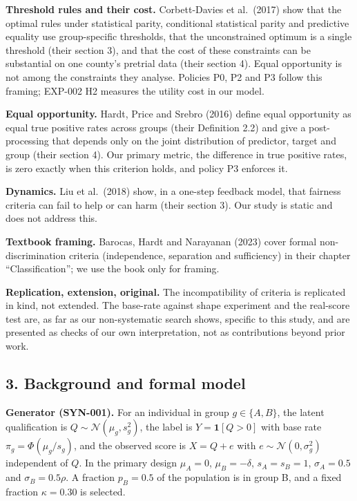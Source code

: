 \documentclass[
]{article}
\begin{document}
\textbf{Threshold rules and their cost.} Corbett-Davies et al.~(2017)
show that the optimal rules under statistical parity, conditional
statistical parity and predictive equality use group-specific
thresholds, that the unconstrained optimum is a single threshold (their
section 3), and that the cost of these constraints can be substantial on
one county's pretrial data (their section 4). Equal opportunity is not
among the constraints they analyse. Policies P0, P2 and P3 follow this
framing; EXP-002 H2 measures the utility cost in our model.

\textbf{Equal opportunity.} Hardt, Price and Srebro (2016) define equal
opportunity as equal true positive rates across groups (their Definition
2.2) and give a post-processing that depends only on the joint
distribution of predictor, target and group (their section 4). Our
primary metric, the difference in true positive rates, is zero exactly
when this criterion holds, and policy P3 enforces it.

\textbf{Dynamics.} Liu et al.~(2018) show, in a one-step feedback model,
that fairness criteria can fail to help or can harm (their section 3).
Our study is static and does not address this.

\textbf{Textbook framing.} Barocas, Hardt and Narayanan (2023) cover
formal non-discrimination criteria (independence, separation and
sufficiency) in their chapter ``Classification''; we use the book only
for framing.

\textbf{Replication, extension, original.} The incompatibility of
criteria is replicated in kind, not extended. The base-rate against
shape experiment and the real-score test are, as far as our
non-systematic search shows, specific to this study, and are presented
as checks of our own interpretation, not as contributions beyond prior
work.

\subsection{3. Background and formal
model}\label{background-and-formal-model}

\textbf{Generator (SYN-001).} For an individual in group
\(g \in \{A, B\}\), the latent qualification is
\(Q \sim \mathcal{N}(\mu_g, s_g^2)\), the label is
\(Y = \mathbf{1}[Q > 0]\) with base rate \(\pi_g = \Phi(\mu_g / s_g)\),
and the observed score is \(X = Q + e\) with
\(e \sim \mathcal{N}(0, \sigma_g^2)\) independent of \(Q\). In the
primary design \(\mu_A = 0\), \(\mu_B = -\delta\), \(s_A = s_B = 1\),
\(\sigma_A = 0.5\) and \(\sigma_B = 0.5\rho\). A fraction \(p_B = 0.5\)
of the population is in group B, and a fixed fraction \(\kappa = 0.30\)
is selected.
\end{document}

